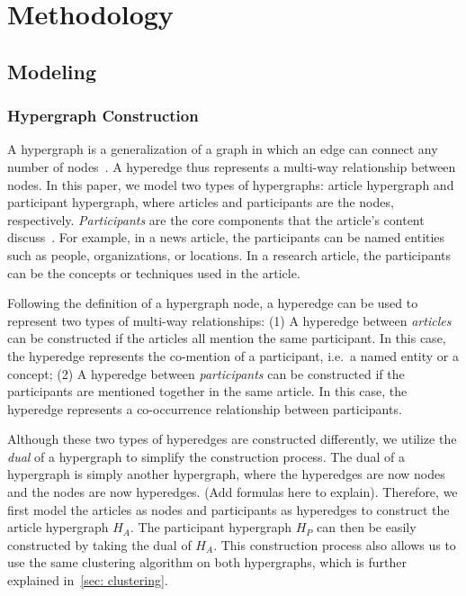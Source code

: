 \section{Methodology}
\subsection{Modeling}
\subsubsection{Hypergraph Construction}
A hypergraph is a generalization of a graph in which an edge can connect any number of nodes~\cite{fischer2021hypergraphsurvey}.
A hyperedge thus represents a multi-way relationship between nodes.
In this paper, we model two types of hypergraphs: article hypergraph and participant hypergraph, where articles and participants are the nodes, respectively.
\textit{Participants} are the core components that the article's content discuss~\cite{use_other_works_to_refine_definition}.
For example, in a news article, the participants can be named entities such as people, organizations, or locations.
In a research article, the participants can be the concepts or techniques used in the article.

Following the definition of a hypergraph node, a hyperedge can be used to represent two types of multi-way relationships:
(1) A hyperedge between \textit{articles} can be constructed if the articles all mention the same participant. 
In this case, the hyperedge represents the co-mention of a participant, i.e.\ a named entity or a concept;
(2) A hyperedge between \textit{participants} can be constructed if the participants are mentioned together in the same article.
In this case, the hyperedge represents a co-occurrence relationship between participants.

Although these two types of hyperedges are constructed differently, we utilize the \textit{dual} of a hypergraph to simplify the construction process.
The dual of a hypergraph is simply another hypergraph, where the hyperedges are now nodes and the nodes are now hyperedges. (Add formulas here to explain).
Therefore, we first model the articles as nodes and participants as hyperedges to construct the article hypergraph $H_A$.
The participant hypergraph $H_P$ can then be easily constructed by taking the dual of $H_A$.
This construction process also allows us to use the same clustering algorithm on both hypergraphs, which is further explained in~\autoref{sec: clustering}.

